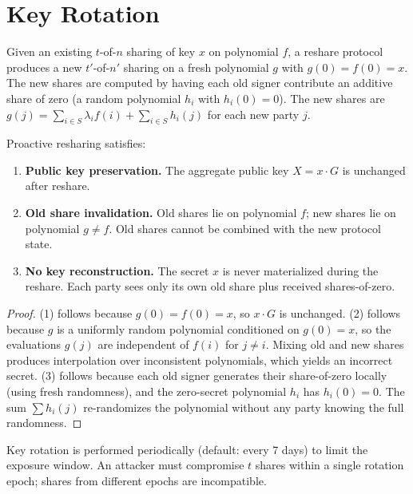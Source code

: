 \section{Key Rotation}

\label{sec:rotation}

\begin{definition}
Given an existing $t$-of-$n$ sharing of key $x$ on polynomial $f$,
a reshare protocol produces a new $t'$-of-$n'$ sharing on a fresh
polynomial $g$ with $g(0) = f(0) = x$.  The new shares are computed
by having each old signer contribute an additive share of zero
(a random polynomial $h_i$ with $h_i(0) = 0$).  The new shares are
$g(j) = \sum_{i \in S} \lambda_i f(i) + \sum_{i \in S} h_i(j)$ for
each new party $j$.
\end{definition}

\begin{theorem}
\label{thm:reshare}
Proactive resharing satisfies:
\begin{enumerate}[nosep]
  \item \textbf{Public key preservation.}  The aggregate public key
        $X = x \cdot G$ is unchanged after reshare.
  \item \textbf{Old share invalidation.}  Old shares lie on polynomial
        $f$; new shares lie on polynomial $g \neq f$.  Old shares
        cannot be combined with the new protocol state.
  \item \textbf{No key reconstruction.}  The secret $x$ is never
        materialized during the reshare.  Each party sees only its
        own old share plus received shares-of-zero.
\end{enumerate}
\end{theorem}

\begin{proof}
(1) follows because $g(0) = f(0) = x$, so $x \cdot G$ is unchanged.
(2) follows because $g$ is a uniformly random polynomial conditioned on
$g(0) = x$, so the evaluations $g(j)$ are independent of $f(i)$ for
$j \neq i$.  Mixing old and new shares produces interpolation over
inconsistent polynomials, which yields an incorrect secret.
(3) follows because each old signer generates their share-of-zero
locally (using fresh randomness), and the zero-secret polynomial
$h_i$ has $h_i(0) = 0$.  The sum $\sum h_i(j)$ re-randomizes the
polynomial without any party knowing the full randomness.
\end{proof}

Key rotation is performed periodically (default: every 7 days) to
limit the exposure window.  An attacker must compromise $t$ shares
within a single rotation epoch; shares from different epochs are
incompatible.

